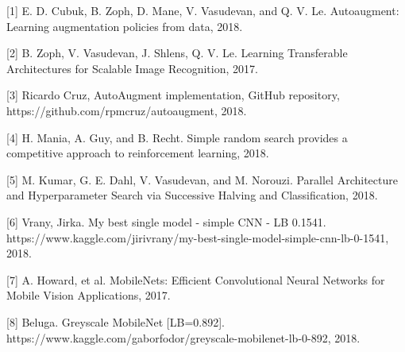 \documentclass[10pt,twocolumn,letterpaper]{article}
\begin{document}
{\small



[1] E. D. Cubuk, B. Zoph, D. Mane, V. Vasudevan, and Q. V. Le. Autoaugment:   Learning  augmentation  policies  from  data, 2018. \newline

[2] B. Zoph, V. Vasudevan, J. Shlens, Q. V. Le. Learning Transferable Architectures for Scalable Image Recognition, 2017. \newline

[3] Ricardo Cruz, AutoAugment implementation, GitHub repository, https://github.com/rpmcruz/autoaugment, 2018. \newline

[4] H. Mania, A. Guy, and B. Recht. Simple random search provides a competitive approach to reinforcement learning, 2018.\newline

[5] M. Kumar, G. E. Dahl, V. Vasudevan, and M. Norouzi. Parallel Architecture and Hyperparameter Search
via Successive Halving and Classification, 2018.\newline

[6] Vrany, Jirka. My best single model - simple CNN - LB 0.1541. https://www.kaggle.com/jirivrany/my-best-single-model-simple-cnn-lb-0-1541, 2018.\newline

[7] A. Howard, et al. MobileNets: Efficient Convolutional Neural Networks for Mobile Vision
Applications, 2017. \newline

[8] Beluga. Greyscale MobileNet [LB=0.892]. https://www.kaggle.com/gaborfodor/greyscale-mobilenet-lb-0-892, 2018.\newline

}
\end{document}
